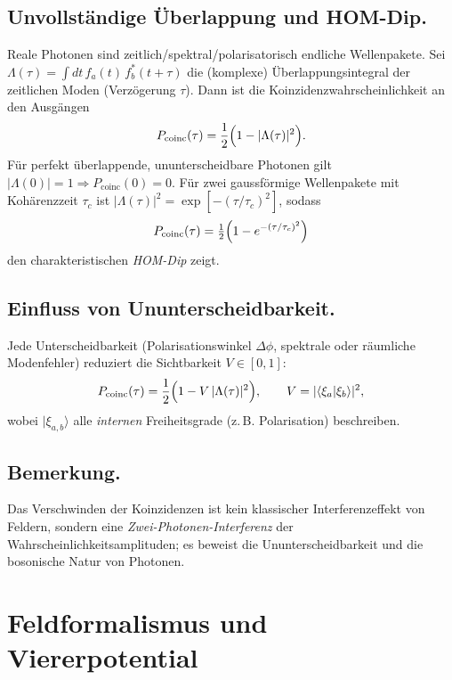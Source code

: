 \subsection*{Unvollständige Überlappung und HOM-Dip.}
Reale Photonen sind zeitlich/spektral/polarisatorisch endliche Wellenpakete. Sei
\(\Lambda(\tau)=\int\!dt\, f_a(t)\,f_b^*(t+\tau)\)
die (komplexe) Überlappungsintegral der zeitlichen Moden (Verzögerung \(\tau\)).
Dann ist die Koinzidenzwahrscheinlichkeit an den Ausgängen
\[
P_{\text{coinc}}(\tau)=\frac{1}{2}\Bigl(1-|\Lambda(\tau)|^2\Bigr).
\]
Für perfekt überlappende, ununterscheidbare Photonen gilt \(|\Lambda(0)|=1\Rightarrow P_{\text{coinc}}(0)=0\).
Für zwei gaussförmige Wellenpakete mit Kohärenzzeit \(\tau_c\) ist
\(|\Lambda(\tau)|^2=\exp[-(\tau/\tau_c)^2]\),
sodass
\[
P_{\text{coinc}}(\tau)=\tfrac{1}{2}\Bigl(1-e^{-(\tau/\tau_c)^2}\Bigr)
\]
den charakteristischen \emph{HOM-Dip} zeigt.

\subsection*{Einfluss von Ununterscheidbarkeit.}
Jede Unterscheidbarkeit (Polarisationswinkel \(\Delta\phi\), spektrale oder räumliche Modenfehler) reduziert die Sichtbarkeit \(V\in[0,1]\):
\[
P_{\text{coinc}}(\tau)=\frac{1}{2}\Bigl(1- V\,|\Lambda(\tau)|^2\Bigr),
\qquad
V=|\langle \xi_a|\xi_b\rangle|^2,
\]
wobei \(|\xi_{a,b}\rangle\) alle \emph{internen} Freiheitsgrade (z.\,B. Polarisation) beschreiben.

\subsection*{Bemerkung.}
Das Verschwinden der Koinzidenzen ist kein klassischer Interferenzeffekt von Feldern, sondern eine \emph{Zwei-Photonen-Interferenz} der Wahrscheinlichkeitsamplituden; es beweist die Ununterscheidbarkeit und die bosonische Natur von
 Photonen.
 
 
\section{Feldformalismus und Viererpotential}
\label{anhangA:feldformalismus}
\label{anhangA:viererpotential} %

